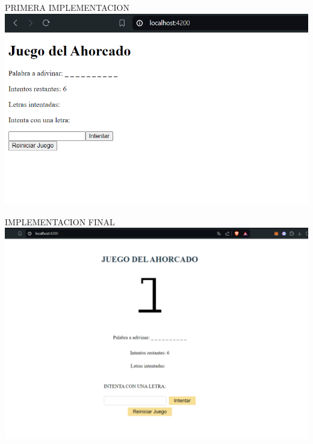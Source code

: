 \documentclass{article}
\begin{document}
        \item PRIMERA IMPLEMENTACION
        \newline \newline\newline\newline 
        \includegraphics[width=1\textwidth,keepaspectratio]{IMAGENES/PRIMERA PRUEBA.png}
        \newline \newline\newline
        \item IMPLEMENTACION FINAL
        \newline \newline\newline\newline  
        \includegraphics[width=1\textwidth,keepaspectratio]{IMAGENES/PRUEBA FINAL.png}
        \newline \newline\newline
\end{document}
